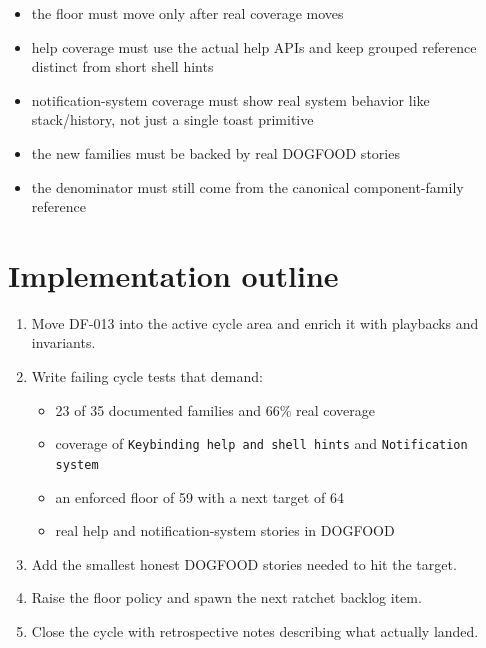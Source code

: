 \begin{itemize}
\tightlist
\item
  the floor must move only after real coverage moves
\item
  help coverage must use the actual help APIs and keep grouped reference distinct from short shell hints
\item
  notification-system coverage must show real system behavior like stack/history, not just a single toast primitive
\item
  the new families must be backed by real DOGFOOD stories
\item
  the denominator must still come from the canonical component-family reference
\end{itemize}

\section{Implementation outline}\label{record-075-implementation-outline}

\begin{enumerate}
\def\labelenumi{\arabic{enumi}.}
\tightlist
\item
  Move DF-013 into the active cycle area and enrich it with playbacks and invariants.
\item
  Write failing cycle tests that demand:

  \begin{itemize}
  \tightlist
  \item
    23 of 35 documented families and 66\% real coverage
  \item
    coverage of \texttt{K\allowbreak{}e\allowbreak{}y\allowbreak{}b\allowbreak{}i\allowbreak{}n\allowbreak{}d\allowbreak{}i\allowbreak{}n\allowbreak{}g\allowbreak{} \allowbreak{}h\allowbreak{}e\allowbreak{}l\allowbreak{}p\allowbreak{} \allowbreak{}a\allowbreak{}n\allowbreak{}d\allowbreak{} \allowbreak{}s\allowbreak{}h\allowbreak{}e\allowbreak{}l\allowbreak{}l\allowbreak{} \allowbreak{}h\allowbreak{}i\allowbreak{}n\allowbreak{}t\allowbreak{}s} and \texttt{N\allowbreak{}o\allowbreak{}t\allowbreak{}i\allowbreak{}f\allowbreak{}i\allowbreak{}c\allowbreak{}a\allowbreak{}t\allowbreak{}i\allowbreak{}o\allowbreak{}n\allowbreak{} \allowbreak{}s\allowbreak{}y\allowbreak{}s\allowbreak{}t\allowbreak{}e\allowbreak{}m}
  \item
    an enforced floor of 59 with a next target of 64
  \item
    real help and notification-system stories in DOGFOOD
  \end{itemize}
\item
  Add the smallest honest DOGFOOD stories needed to hit the target.
\item
  Raise the floor policy and spawn the next ratchet backlog item.
\item
  Close the cycle with retrospective notes describing what actually landed.
\end{enumerate}

